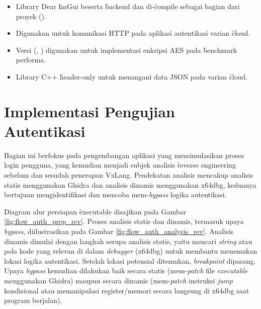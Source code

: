 \begin{itemize}
\begin{itemize}
              \item {} Library Dear ImGui beserta \f{backend}  dan  di-\f{compile} sebagai bagian dari proyek ().
              \item {} Digunakan untuk komunikasi HTTP pada aplikasi autentikasi varian \f{cloud}.
              \item {} Versi  (, ) digunakan untuk implementasi enkripsi AES pada \f{benchmark} performa.
              \item {} Library C++ \f{header-only} untuk menangani data JSON pada varian \f{cloud}.
          \end{itemize}
\end{itemize}

\section{Implementasi Pengujian Autentikasi}
Bagian ini berfokus pada pengembangan aplikasi yang mensimulasikan proses login pengguna, yang kemudian menjadi subjek analisis \f{reverse engineering} sebelum dan sesudah penerapan VxLang. Pendekatan analisis mencakup analisis statis menggunakan Ghidra dan analisis dinamis menggunakan x64dbg, keduanya bertujuan mengidentifikasi dan mencoba mem-\textit{bypass} logika autentikasi.

Diagram alur persiapan \f{executable} disajikan pada Gambar \ref{fig:flow_auth_prep_rev}. Proses analisis statis dan dinamis, termasuk upaya \textit{bypass}, diilustrasikan pada Gambar \ref{fig:flow_auth_analysis_rev}. Analisis dinamis dimulai dengan langkah serupa analisis statis, yaitu mencari \textit{string} atau pola kode yang relevan di dalam \textit{debugger} (x64dbg) untuk membantu menemukan lokasi logika autentikasi. Setelah lokasi potensial ditemukan, \textit{breakpoint} dipasang. Upaya \textit{bypass} kemudian dilakukan baik secara statis (mem-\textit{patch} file \textit{executable} menggunakan Ghidra) maupun secara dinamis (mem-\textit{patch} instruksi \textit{jump} kondisional atau memanipulasi register/memori secara langsung di x64dbg saat program berjalan).

